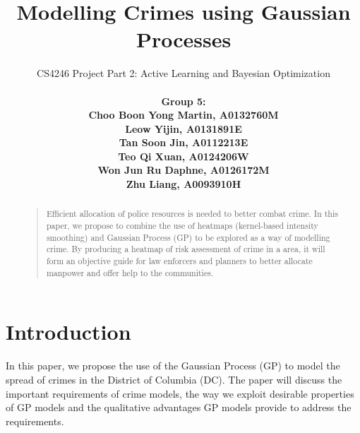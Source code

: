 \documentclass[letterpaper]{article}
\begin{document}
	\title{Modelling Crimes using Gaussian Processes}
	\author{CS4246 Project Part 2: Active Learning and Bayesian Optimization\\ \\
	\bf \small Group 5:\\
	\small Choo Boon Yong Martin, A0132760M\\
	\small Leow Yijin, A0131891E\\
	\small Tan Soon Jin, A0112213E\\
	\small Teo Qi Xuan, A0124206W\\
	\small Won Jun Ru Daphne, A0126172M\\
	\small Zhu Liang, A0093910H\\
	}	
	
	
	\maketitle
	\thispagestyle{empty}
	\pagestyle{empty}
	
	
	
	\begin{abstract}
	\begin{quote}
		Efficient allocation of police resources is needed to better combat crime. In this paper, we propose to combine the use of heatmaps (kernel-based intensity smoothing) and Gaussian Process (GP) to be explored as a way of modelling crime. By producing a heatmap of risk assessment of crime in a area, it will form an objective guide for law enforcers and planners to better allocate manpower and offer help to the communities.
	\end{quote}
	\end{abstract}
	
	
	\section{Introduction}
	
	In this paper, we propose the use of the Gaussian Process (GP) to model the spread of crimes in the District of Columbia (DC).
	The paper will discuss the important requirements of crime models, the way we exploit desirable properties of GP models and the qualitative advantages GP models provide to address the requirements.\\ \\
\end{document}
